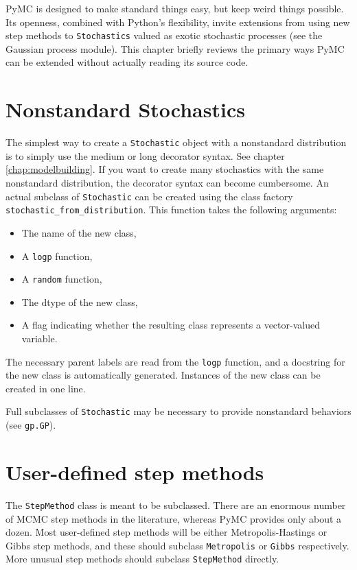PyMC is designed to make standard things easy, but keep weird things possible. Its openness, combined with Python's flexibility, invite extensions from using new step methods to \texttt{Stochastics} valued as exotic stochastic processes (see the Gaussian process module). This chapter briefly reviews the primary ways PyMC can be extended without actually reading its source code. 

\hypertarget{nonstandard}{}
\section*{Nonstandard Stochastics} \label{nonstandard}

The simplest way to create a \texttt{Stochastic} object with a nonstandard distribution is to simply use the medium or long decorator syntax. See chapter \ref{chap:modelbuilding}. If you want to create many stochastics with the same nonstandard distribution, the decorator syntax can become cumbersome. An actual subclass of \texttt{Stochastic} can be created using the class factory \texttt{stochastic_from_distribution}. This function takes the following arguments:
\begin{itemize}
   \item The name of the new class,
   \item A \texttt{logp} function,
   \item A \texttt{random} function,
   \item The dtype of the new class,
   \item A flag indicating whether the resulting class represents a vector-valued variable.
\end{itemize}
The necessary parent labels are read from the \texttt{logp} function, and a docstring for the new class is automatically generated. Instances of the new class can be created in one line.

Full subclasses of \texttt{Stochastic} may be necessary to provide nonstandard behaviors (see \texttt{gp.GP}).

\hypertarget{custom-stepper}{}
\section*{User-defined step methods} \label{custom-stepper}
The \texttt{StepMethod} class is meant to be subclassed. There are an enormous number of MCMC step methods in the literature, whereas PyMC provides only about a dozen. Most user-defined step methods will be either Metropolis-Hastings or Gibbs step methods, and these should subclass \texttt{Metropolis} or \texttt{Gibbs} respectively. More unusual step methods should subclass \texttt{StepMethod} directly.

